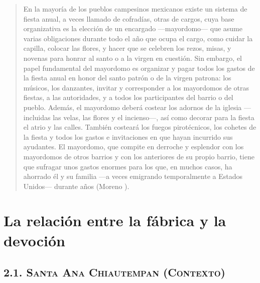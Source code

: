 \documentclass[14pt,letterpaper,twoside]{extbook} %
\begin{document}
\begin{quotation}
\noindent En la mayoría de los pueblos campesinos mexicanos existe un sistema de fiesta anual, a veces llamado de cofradías, otras de cargos, cuya base organizativa es la elección de un encargado ---mayordomo--- que asume varias obligaciones durante todo el año que ocupa el cargo, como cuidar la capilla, colocar las flores, y hacer que se celebren los rezos, misas, y novenas para honrar al santo o a la virgen en cuestión. Sin embargo, el papel fundamental del mayordomo es organizar y pagar todos los gastos de la fiesta anual en honor del santo patrón o de la virgen patrona: los músicos, los danzantes, invitar y corresponder a los mayordomos de otras fiestas, a las autoridades, y a todos los participantes del barrio o del pueblo. Además, el mayordomo deberá costear los adornos de la iglesia ---incluidas las velas, las flores y el incienso---, así como decorar para la fiesta el atrio y las calles. También costeará los fuegos pirotécnicos, los cohetes de la fiesta y todos los gastos e invitaciones en que hayan incurrido sus ayudantes. El mayordomo, que compite en derroche y esplendor con los mayordomos de otros barrios y con los anteriores de su propio barrio, tiene que sufragar unos gastos enormes para los que, en muchos casos, ha ahorrado él y su familia ---a veces emigrando temporalmente a Estados Unidos--- durante años (Moreno ).
\end{quotation}


\chapter{\mdseries La relación entre la fábrica y la devoción}\label{Capitulo_2}
\pagestyle{fancy}
\fancyhf{}
\fancyfoot[RO,LE]{\hfill \thepage \hfill}

\section*{\mdseries\large\textsc{2.1. Santa Ana Chiautempan (Contexto)}}

\end{document}
